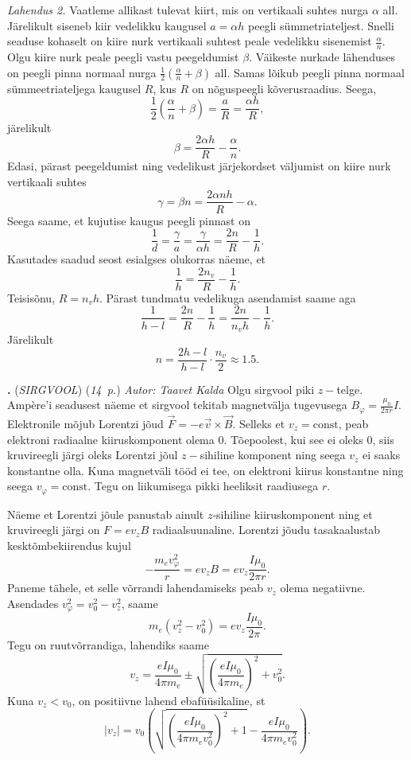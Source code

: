 \documentclass[11pt,a5paper]{article}
\newcommand{\numb}[1]{\vspace{5pt}\textbf{\large #1}}
\newcommand{\nimi}[1]{(\textsl{\small #1})}
\newcommand{\punktid}[1]{(\emph{#1~p.})}
\newcounter{ylesanne}
\newcommand{\yl}[1]{\addtocounter{ylesanne}{1}\numb{\theylesanne.} \nimi{#1} \newblock{}}
\newcommand{\autor}[1]{\emph{ Autor: #1}} %
\begin{document}
\emph{Lahendus 2.}
Vaatleme allikast tulevat kiirt, mis on vertikaali suhtes nurga $\alpha$ all. Järelikult siseneb kiir vedelikku kaugusel $a = \alpha h$ peegli sümmetriateljest. Snelli seaduse kohaselt on kiire nurk vertikaali suhtest peale vedelikku sisenemist $\frac{\alpha }{n}$. Olgu kiire nurk peale peegli vastu peegeldumist $\beta$. Väikeste nurkade lähenduses on peegli pinna normaal nurga $\frac{1}{2} (\frac{\alpha}{n} + \beta)$ all. Samas lõikub peegli pinna normaal sümmeetriateljega kaugusel $R$, kus $R$ on nõguspeegli kõverusraadius. Seega,
\[
  \frac{1}{2} \left(\frac{\alpha}{n} + \beta\right) = \frac{a}{R} = \frac{\alpha h}{R},
\]
järelikult
\[
  \beta = \frac{2\alpha h}{R} - \frac{\alpha}{n}.
\]
Edasi, pärast peegeldumist ning vedelikust järjekordset väljumist on kiire nurk vertikaali suhtes
\[
  \gamma = \beta n = \frac{2\alpha nh}{R} - \alpha.
\]
Seega saame, et kujutise kaugus peegli pinnast on
\[
  \frac{1}{d} = \frac{\gamma}{a} = \frac{\gamma}{\alpha h} = \frac{2n}{R}- \frac{1}{h}.
\]
Kasutades saadud seost esialgses olukorras näeme, et
\[
  \frac{1}{h} = \frac{2n_v}{R} - \frac{1}{h}.
\]
Teisisõnu, $R = n_v h$. Pärast tundmatu vedelikuga asendamist saame aga
\[
  \frac{1}{h - l} = \frac{2n}{R} - \frac{1}{h} = \frac{2n}{n_v h} - \frac{1}{h}.
\]
Järelikult
\[
  n = \frac{2h-l}{h - l}\cdot  \frac{n_v}{2} \approx \num{1.5}.
\]

\yl{SIRGVOOL}
\punktid{14} \autor{Taavet Kalda}
Olgu sirgvool piki $z-$telge. Ampère'i seadusest näeme et sirgvool tekitab magnetvälja tugevusega $B_\varphi = \frac{\mu_0}{2\pi r}I$. Elektronile mõjub Lorentzi jõud $\vec F = -e\vec v \times \vec B$. Selleks et $v_z = \mathrm{const}$, peab elektroni radiaalne kiiruskomponent olema $0$. Tõepoolest, kui see ei oleks 0, siis kruvireegli järgi oleks Lorentzi jõul $z-$sihiline komponent ning seega $v_z$ ei saaks konstantne olla. Kuna magnetväli tööd ei tee, on elektroni kiirus konstantne ning seega $v_\varphi = \mathrm{const}$. Tegu on liikumisega pikki heeliksit raadiusega $r$.

Näeme et Lorentzi jõule panustab ainult $z$-sihiline kiiruskomponent ning et kruvireegli järgi on $F = ev_z B$ radiaalsuunaline. Lorentzi jõudu tasakaalustab kesktõmbekiirendus kujul
\[
-\frac{m_ev_\varphi^2}{r} = ev_z B = ev_z \frac{I \mu_0}{2\pi r}.
\]
Paneme tähele, et selle võrrandi lahendamiseks peab $v_z$ olema negatiivne. Asendades $v_\varphi^2 = v_0^2 - v_z^2$, saame
\[
m_e(v_z^2 - v_0^2) = ev_z \frac{I\mu_0}{2\pi}.
\]
Tegu on ruutvõrrandiga, lahendiks saame
\[
v_z = \frac{e I\mu_0}{4\pi m_e} \pm \sqrt{\left(\frac{e I\mu_0}{4\pi m_e}\right)^2+v_0^2}.
\]
Kuna $v_z < v_0$, on positiivne lahend ebafüüsikaline, st
\[
|v_z| = v_0 \left(\sqrt{\left(\frac{e I\mu_0}{4\pi m_e v_0^2}\right)^2 + 1} - \frac{e I\mu_0}{4\pi m_e v_0^2}\right).
\]
\end{document}
